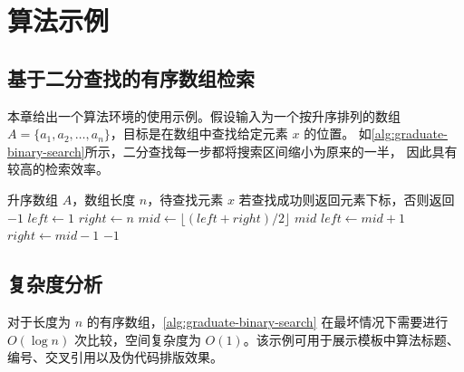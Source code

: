 
\chapter{算法示例}

\section{基于二分查找的有序数组检索}

本章给出一个算法环境的使用示例。假设输入为一个按升序排列的数组
$A = \{a_1, a_2, \ldots, a_n\}$，目标是在数组中查找给定元素 $x$ 的位置。
如\autoref{alg:graduate-binary-search}所示，二分查找每一步都将搜索区间缩小为原来的一半，
因此具有较高的检索效率。

\begin{algorithm}[htbp]
    \caption{二分查找算法示例}
    \label{alg:graduate-binary-search}
    \begin{algorithmic}[1]
        \Require 升序数组 $A$，数组长度 $n$，待查找元素 $x$
        \Ensure 若查找成功则返回元素下标，否则返回 $-1$
        \State $left \gets 1$
        \State $right \gets n$
            \State $mid \gets \lfloor (left + right) / 2 \rfloor$
                \State \Return $mid$
                \State $left \gets mid + 1$
            \Else
                \State $right \gets mid - 1$
            \EndIf
        \EndWhile
        \State \Return $-1$
    \end{algorithmic}
\end{algorithm}

\section{复杂度分析}

对于长度为 $n$ 的有序数组，\autoref{alg:graduate-binary-search} 在最坏情况下需要进行
$O(\log n)$ 次比较，空间复杂度为 $O(1)$。该示例可用于展示模板中算法标题、
编号、交叉引用以及伪代码排版效果。
